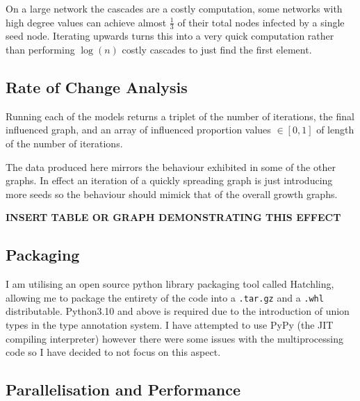 \documentclass{article}
\begin{document}
On a large network the cascades are a costly computation, some networks with high degree values can achieve almost $\frac{1}{3}$ of their total nodes infected by a single seed node.
Iterating upwards turns this into a very quick computation rather than performing $\log(n)$ costly cascades to just find the first element.


\subsection{Rate of Change Analysis}

Running each of the models returns a triplet of the number of iterations, the final influenced graph, and an array of influenced proportion values $\in [0, 1]$ of length of the number of iterations.

The data produced here mirrors the behaviour exhibited in some of the other graphs. In effect an iteration of a quickly spreading graph is just introducing more seeds so the behaviour should mimick that of the overall growth graphs.

\textbf{INSERT TABLE OR GRAPH DEMONSTRATING THIS EFFECT}

\subsection{Packaging}

I am utilising an open source python library packaging tool called Hatchling, allowing me to package the entirety of the code into a \texttt{.tar.gz} and a \texttt{.whl} distributable.
Python3.10 and above is required due to the introduction of union types in the type annotation system.
I have attempted to use PyPy (the JIT compiling interpreter) however there were some issues with the multiprocessing code so I have decided to not focus on this aspect.


%
%

\subsection{Parallelisation and Performance}
\end{document}
